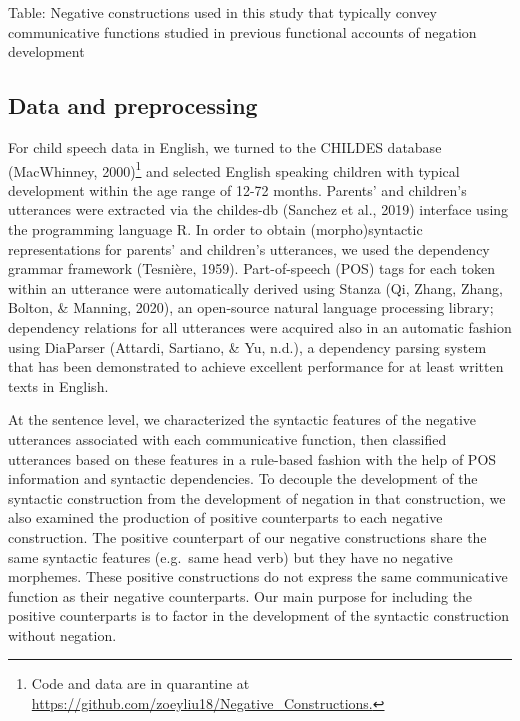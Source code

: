 \documentclass[
  english,
  man,floatsintext]{apa6}
\begin{document}
Table: \label{tab:constructions} Negative constructions used in this study that typically convey communicative functions studied in previous functional accounts of negation development

\hypertarget{data-and-preprocessing}{%
\subsection{Data and preprocessing}\label{data-and-preprocessing}}

For child speech data in English, we turned to the CHILDES database (MacWhinney, 2000)\footnote{Code and data are in quarantine at \url{https://github.com/zoeyliu18/Negative_Constructions.}} and selected English speaking children with typical development within the age range of 12-72 months. Parents' and children's utterances were extracted via the childes-db (Sanchez et al., 2019) interface using the programming language R. In order to obtain (morpho)syntactic representations for parents' and children's utterances, we used the dependency grammar framework (Tesnière, 1959). Part-of-speech (POS) tags for each token within an utterance were automatically derived using Stanza (Qi, Zhang, Zhang, Bolton, \& Manning, 2020), an open-source natural language processing library; dependency relations for all utterances were acquired also in an automatic fashion using DiaParser (Attardi, Sartiano, \& Yu, n.d.), a dependency parsing system that has been demonstrated to achieve excellent performance for at least written texts in English.

At the sentence level, we characterized the syntactic features of the negative utterances associated with each communicative function, then classified utterances based on these features in a rule-based fashion with the help of POS information and syntactic dependencies. To decouple the development of the syntactic construction from the development of negation in that construction, we also examined the production of positive counterparts to each negative construction. The positive counterpart of our negative constructions share the same syntactic features (e.g.~same head verb) but they have no negative morphemes. These positive constructions do not express the same communicative function as their negative counterparts. Our main purpose for including the positive counterparts is to factor in the development of the syntactic construction without negation.
\end{document}
